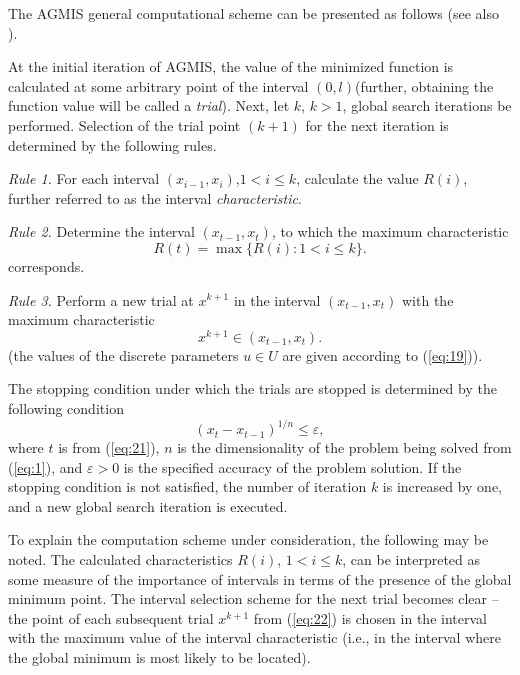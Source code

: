 \documentclass{svproc}
\begin{document}
The AGMIS general computational scheme can be presented as follows (see also \cite{c21}).

At the initial iteration of AGMIS, the value of the minimized function is calculated at some arbitrary point of the interval $(0,l)$(further, obtaining the function value will be called a \textit{trial}). Next, let $k$, $k > 1$, global search iterations be performed. Selection of the trial point $(k+1)$ for the next iteration is determined by the following rules.

\textit{Rule 1.} For each interval $(x_{i-1}, x_i)$,$1<i \leq k$, calculate the value $R(i)$, further referred to as the interval \textit{characteristic}. 

\textit{Rule 2.} Determine the interval $(x_{t-1}, x_t)$, to which the maximum characteristic
\begin{equation}\label{eq:21}
R(t)=\max\{R(i): 1<i\leq k\}.
\end{equation}
corresponds.

\textit{Rule 3.} Perform a new trial at $x^{k+1}$ in the interval $(x_{t-1}, x_t)$ with the maximum characteristic
\begin{equation}\label{eq:22}
x^{k+1} \in (x_{t-1}, x_t).
\end{equation}
(the values of the discrete parameters $u \in U$ are given according to (\ref{eq:19})).

 The stopping condition under which the trials are stopped is determined by the following condition
\begin{equation}\label{eq:23}
(x_t - x_{t-1})^{1/n} \leq \varepsilon, 
\end{equation}
where $t$ is from (\ref{eq:21}), $n$ is the dimensionality of the problem being solved from (\ref{eq:1}), and $\varepsilon > 0$ is the specified accuracy of the problem solution. If the stopping condition is not satisfied, the number of iteration $k$ is increased by one, and a new global search iteration is executed.

   To explain the computation scheme under consideration, the following may be noted. The calculated characteristics $R(i)$, $1<i \leq k$, can be interpreted as some measure of the importance of intervals in terms of the presence of the global minimum point. The interval selection scheme for the next trial becomes clear -- the point of each subsequent trial $x^{k+1}$ from (\ref{eq:22}) is chosen in the interval with the maximum value of the interval characteristic (i.e., in the interval  where the global minimum is most likely to be located).
\end{document}
